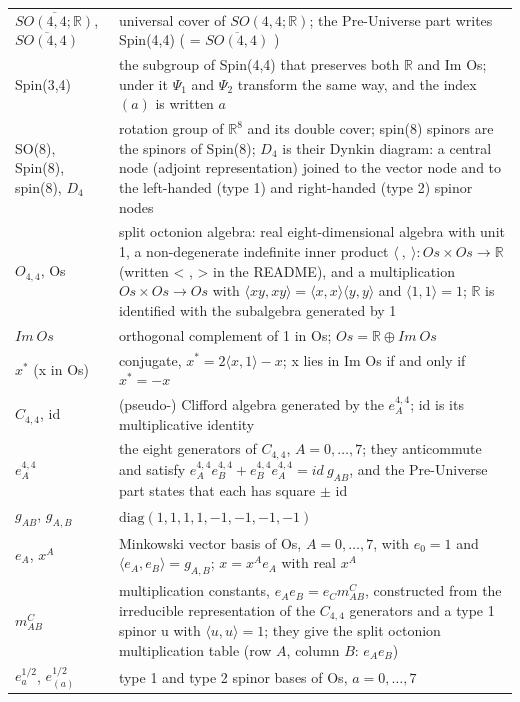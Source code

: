 \documentclass[10pt]{article}
\begin{document}
{\begin{longtable}{>{\raggedright\arraybackslash}p{}>{\raggedright\arraybackslash}p{}}
$\overline{SO(4,4;\mathbb R)}$, $\overline{SO(4,4)}$ & universal cover of $SO(4,4;\mathbb R)$; the Pre-Universe part writes Spin(4,4) ( = $\overline{SO(4,4)}$ ) \\
Spin(3,4) & the subgroup of Spin(4,4) that preserves both $\mathbb R$ and Im Os; under it $\Psi_1$ and $\Psi_2$ transform the same way, and the index $(a)$ is written $a$ \\
SO(8), Spin(8), spin(8), $D_4$ & rotation group of $\mathbb R^8$ and its double cover; spin(8) spinors are the spinors of Spin(8); $D_4$ is their Dynkin diagram: a central node (adjoint representation) joined to the vector node and to the left-handed (type 1) and right-handed (type 2) spinor nodes \\
$O_{4,4}$, Os & split octonion algebra: real eight-dimensional algebra with unit 1, a non-degenerate indefinite inner product $\langle\ ,\ \rangle: Os\times Os\to\mathbb R$ (written \textless{} , \textgreater{} in the README), and a multiplication $Os\times Os\to Os$ with $\langle xy, xy\rangle = \langle x,x\rangle\langle y,y\rangle$ and $\langle 1,1\rangle = 1$; $\mathbb R$ is identified with the subalgebra generated by 1 \\
$Im\ Os$ & orthogonal complement of 1 in Os; $Os = \mathbb R\oplus Im\ Os$ \\
$x^*$ (x in Os) & conjugate, $x^* = 2\langle x,1\rangle - x$; x lies in Im Os if and only if $x^* = -x$ \\
$C_{4,4}$, id & (pseudo-) Clifford algebra generated by the $e^{4,4}_A$; id is its multiplicative identity \\
$e^{4,4}_A$ & the eight generators of $C_{4,4}$, $A = 0, \dots, 7$; they anticommute and satisfy $e^{4,4}_Ae^{4,4}_B + e^{4,4}_Be^{4,4}_A = id\ g_{AB}$, and the Pre-Universe part states that each has square $\pm$ id \\
$g_{AB}$, $g_{A,B}$ & $\mathrm{diag}(1,1,1,1,-1,-1,-1,-1)$ \\
$e_A$, $x^A$ & Minkowski vector basis of Os, $A = 0, \dots, 7$, with $e_0 = 1$ and $\langle e_A, e_B\rangle = g_{A,B}$; $x = x^Ae_A$ with real $x^A$ \\
$m^C_{AB}$ & multiplication constants, $e_Ae_B = e_Cm^C_{AB}$, constructed from the irreducible representation of the $C_{4,4}$ generators and a type 1 spinor u with $\langle u,u\rangle = 1$; they give the split octonion multiplication table (row $A$, column $B$: $e_Ae_B$) \\
$e^{1/2}_a$, $e^{1/2}_{(a)}$ & type 1 and type 2 spinor bases of Os, $a = 0, \dots, 7$ \\

\end{longtable}}
\end{document}
